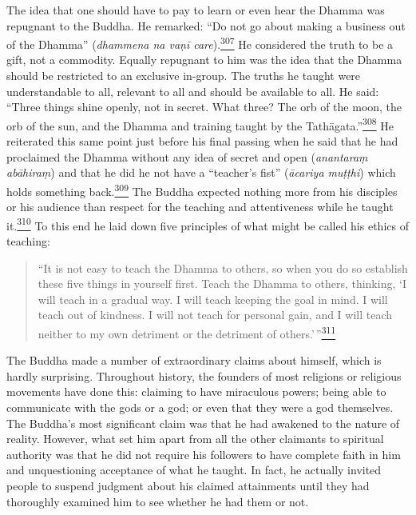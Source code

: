 The idea that one should have to pay to learn or even hear the Dhamma
was repugnant to the Buddha. He remarked: ``Do not go about making a
business out of the Dhamma'' (\emph{dhammena na vaṇī
care}).\label{footprints_split_010.html_fnref307}\hyperref[footprints_split_024.htmlux5cux23fn307]{\textsuperscript{307}}
He considered the truth to be a gift, not a commodity. Equally repugnant
to him was the idea that the Dhamma should be restricted to an exclusive
in-group. The truths he taught were understandable to all, relevant to
all and should be available to all. He said: ``Three things shine
openly, not in secret. What three? The orb of the moon, the orb of the
sun, and the Dhamma and training taught by the
Tathāgata.''\label{footprints_split_010.html_fnref308}\hyperref[footprints_split_024.htmlux5cux23fn308]{\textsuperscript{308}}
He reiterated this same point just before his final passing when he said
that he had proclaimed the Dhamma without any idea of secret and open
(\emph{anantaraṃ abāhiraṃ}) and that he did he not have a ``teacher's
fist'' (\emph{ācariya muṭṭhi}) which holds something
back.\label{footprints_split_010.html_fnref309}\hyperref[footprints_split_024.htmlux5cux23fn309]{\textsuperscript{309}}
The Buddha expected nothing more from his disciples or his audience than
respect for the teaching and attentiveness while he taught
it.\label{footprints_split_010.html_fnref310}\hyperref[footprints_split_024.htmlux5cux23fn310]{\textsuperscript{310}}
To this end he laid down five principles of what might be called his
ethics of teaching:

\begin{quote}
``It is not easy to teach the Dhamma to others, so when you do so
establish these five things in yourself first. Teach the Dhamma to
others, thinking, `I will teach in a gradual way. I will teach keeping
the goal in mind. I will teach out of kindness. I will not teach for
personal gain, and I will teach neither to my own detriment or the
detriment of
others.'\,''\label{footprints_split_010.html_fnref311}\hyperref[footprints_split_024.htmlux5cux23fn311]{\textsuperscript{311}}
\end{quote}

The Buddha made a number of extraordinary claims about himself, which is
hardly surprising. Throughout history, the founders of most religions or
religious movements have done this: claiming to have miraculous powers;
being able to communicate with the gods or a god; or even that they were
a god themselves. The Buddha's most significant claim was that he had
awakened to the nature of reality. However, what set him apart from all
the other claimants to spiritual authority was that he did not require
his followers to have complete faith in him and unquestioning acceptance
of what he taught. In fact, he actually invited people to suspend
judgment about his claimed attainments until they had thoroughly
examined him to see whether he had them or not.

